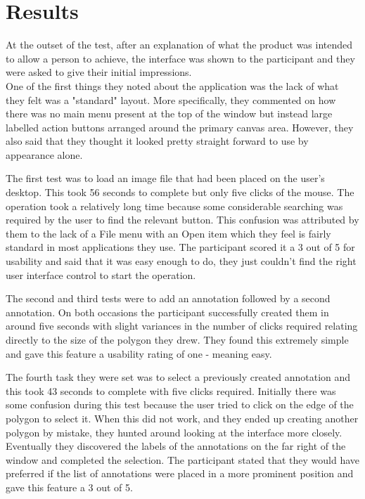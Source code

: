 \section{Results}

At the outset of the test, after an explanation of what the product was intended to allow a person to achieve, the interface was shown to the participant and they were asked to give their initial impressions.  \\
One of the first things they noted about the application was the lack of what they felt was a "standard" layout.  More specifically, they commented on how there was no main menu present at the top of the window but instead large labelled action buttons arranged around the primary canvas area.  However, they also said that they thought it looked pretty straight forward to use by appearance alone.

The first test was to load an image file that had been placed on the user's desktop.  This took 56 seconds to complete but only five clicks of the mouse.  The operation took a relatively long time because some considerable searching was required by the user to find the relevant button.  This confusion was attributed by them to the lack of a File menu with an Open item which they feel is fairly standard in most applications they use.  The participant scored it a 3 out of 5 for usability and said that it was easy enough to do, they just couldn't find the right user interface control to start the operation.

The second and third tests were to add an annotation followed by a second annotation.  On both occasions the participant successfully created them in around five seconds with slight variances in the number of clicks required relating directly to the size of the polygon they drew.  They found this extremely simple and gave this feature a usability rating of one - meaning easy.

The fourth task they were set was to select a previously created annotation and this took 43 seconds to complete with five clicks required.  Initially there was some confusion during this test because the user tried to click on the edge of the polygon to select it.  When this did not work, and they ended up creating another polygon by mistake, they hunted around looking at the interface more closely.  Eventually they discovered the labels of the annotations on the far right of the window and completed the selection.  The participant stated that they would have preferred if the list of annotations were placed in a more prominent position and gave this feature a 3 out of 5.

